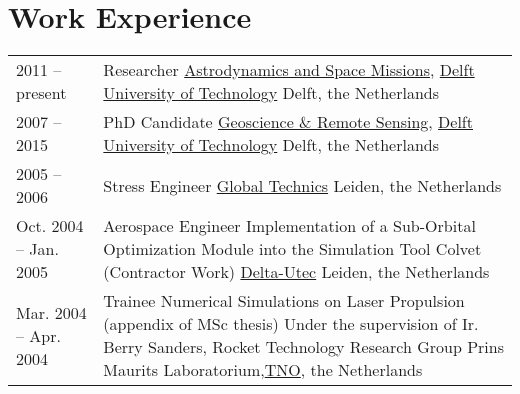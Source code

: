 \documentclass[a4paper]{article}
\newenvironment{cvsection}[2]{
  \vspace{0.2in}
  \section*{#1}
  \vspace{-0.2in}
  \begin{longtable}{lp{#2}}
}{
  \end{longtable}
}
\begin{document}



\begin{cvsection}{Work Experience}{10.8cm}

2011 -- present
  & Researcher\newline
    \href{http://www.as.lr.tudelft.nl}{Astrodynamics and Space Missions}, \href{http://www.tudelft.nl/}{Delft University of Technology}\newline
    Delft, the Netherlands\\[0.2cm]

2007 -- 2015
  & PhD Candidate\newline
    \href{http://www.citg.tudelft.nl/over-faculteit/afdelingen/geoscience-and-remote-sensing/}{Geoscience \& Remote Sensing}, \href{http://www.tudelft.nl/}{Delft University of Technology}\newline
    Delft, the Netherlands\\[0.2cm]

2005 -- 2006
  & Stress Engineer\newline
    \href{http://www.globaltechnics.nl/}{Global Technics}\newline
    Leiden, the Netherlands\\[0.2cm]


Oct. 2004 -- Jan. 2005
  & Aerospace Engineer\newline
  Implementation of a Sub-Orbital Optimization Module into the Simulation Tool Colvet (Contractor Work)\newline
  \href{http://www.delta-utec.com/}{Delta-Utec}\newline
  Leiden, the Netherlands\\[0.2cm]

Mar. 2004 -- Apr. 2004
  & Trainee\newline
    Numerical Simulations on Laser Propulsion (appendix of MSc thesis)\newline
    Under the supervision of Ir. Berry Sanders, Rocket Technology Research Group\newline
    Prins Maurits Laboratorium,\href{http://www.tno.nl/}{TNO}, the Netherlands\\[0.2cm]


\end{cvsection}
\end{document}
